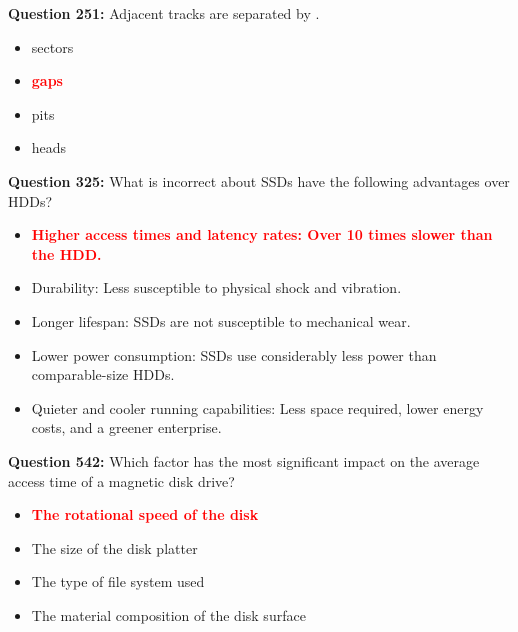 \documentclass[12pt,a4paper]{article}
\begin{document}
\vspace{0.5cm}

\textbf{Question 251:} Adjacent tracks are separated by \underline{\hspace{1.5cm}}.

\begin{itemize}
    \item[\textbf{A.}] sectors
    \item[\textbf{B.}] \textcolor{red}{\textbf{gaps}}
    \item[\textbf{C.}] pits
    \item[\textbf{D.}] heads
\end{itemize}

\vspace{0.5cm}

\vspace{0.5cm}

\textbf{Question 325:} What is incorrect about SSDs have the following advantages over HDDs?

\begin{itemize}
    \item[\textbf{A.}] \textcolor{red}{\textbf{Higher access times and latency rates: Over 10 times slower than the HDD.}}
    \item[\textbf{B.}] Durability: Less susceptible to physical shock and vibration.
    \item[\textbf{C.}] Longer lifespan: SSDs are not susceptible to mechanical wear.
    \item[\textbf{D.}] Lower power consumption: SSDs use considerably less power than comparable-size HDDs.
    \item[\textbf{E.}] Quieter and cooler running capabilities: Less space required, lower energy costs, and a greener enterprise.
\end{itemize}

\vspace{0.5cm}

\vspace{0.5cm}



\textbf{Question 542:} Which factor has the most significant impact on the average access time of a magnetic disk drive?

\begin{itemize}
    \item[\textbf{A.}] \textcolor{red}{\textbf{The rotational speed of the disk}}
    \item[\textbf{B.}] The size of the disk platter
    \item[\textbf{C.}] The type of file system used
    \item[\textbf{D.}] The material composition of the disk surface
\end{itemize}
\end{document}
